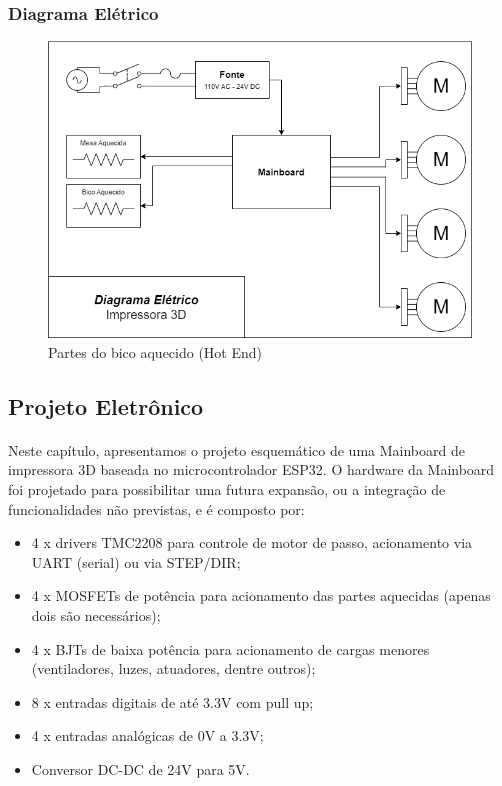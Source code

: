 \documentclass[12pt, english]{article}
\begin{document}
\subsubsection{Diagrama Elétrico}


\begin{figure}[H]
	\centering
	\includegraphics[width=.8\linewidth]{diagrama-eletrico.png}
	\caption{Partes do bico aquecido (Hot End)}
\end{figure}

\subsection{Projeto Eletrônico}

\paragraph{}
Neste capítulo, apresentamos o projeto esquemático de uma Mainboard de impressora 3D baseada no microcontrolador ESP32. O hardware da Mainboard foi projetado para possibilitar uma futura expansão, ou a integração de funcionalidades não previstas, e é composto por:

\begin{itemize}
	\item {
		4 x drivers TMC2208 para controle de motor de passo, acionamento via UART (serial) ou via STEP/DIR;
	}
	\item {
		4 x MOSFETs de potência para acionamento das partes aquecidas (apenas dois são necessários);
	}
	\item {
		4 x BJTs de baixa potência para acionamento de cargas menores (ventiladores, luzes, atuadores, dentre outros);
	}
	\item {
		8 x entradas digitais de até 3.3V com pull up;
	}
	\item {
		4 x entradas analógicas de 0V a 3.3V;
	}
	\item {
		Conversor DC-DC de 24V para 5V.
	}
\end{itemize}
\end{document}
